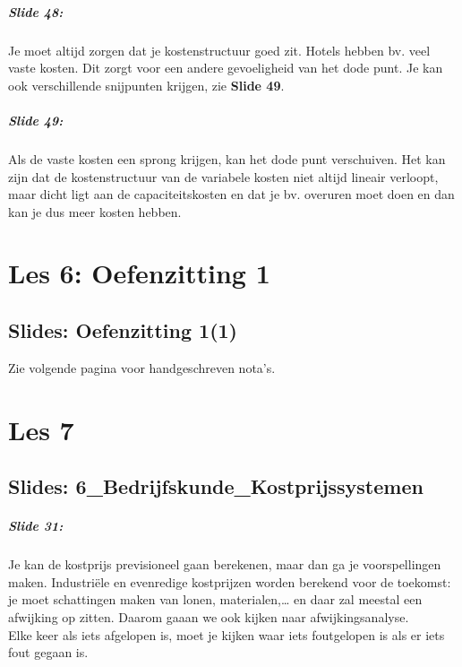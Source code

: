 \documentclass[10pt,a4paper]{report}
\begin{document}
\paragraph{Slide 48:} Je moet altijd zorgen dat je kostenstructuur goed zit. Hotels hebben bv. veel vaste kosten. Dit zorgt voor een andere gevoeligheid van het dode punt. Je kan ook verschillende snijpunten krijgen, zie \textbf{Slide 49}.

\paragraph{Slide 49:} Als de vaste kosten een sprong krijgen, kan het dode punt verschuiven. Het kan zijn dat de kostenstructuur van de variabele kosten niet altijd lineair verloopt, maar dicht ligt aan de capaciteitskosten en dat je bv. overuren moet doen en dan kan je dus meer kosten hebben.

\chapter{Les 6: Oefenzitting 1}
\section{Slides: Oefenzitting 1(1)}
Zie volgende pagina voor handgeschreven nota's.

 

\chapter{Les 7}

\section{Slides: 6\_Bedrijfskunde\_Kostprijssystemen}

\paragraph{Slide 31:} Je kan de kostprijs previsioneel gaan berekenen, maar dan ga je voorspellingen maken. Industri\"ele en evenredige kostprijzen worden berekend voor de toekomst: je moet schattingen maken van lonen, materialen,… en daar zal meestal een afwijking op zitten. Daarom gaaan we ook kijken naar afwijkingsanalyse. \\
Elke keer als iets afgelopen is, moet je kijken waar iets foutgelopen is als er iets fout gegaan is.
\end{document}
